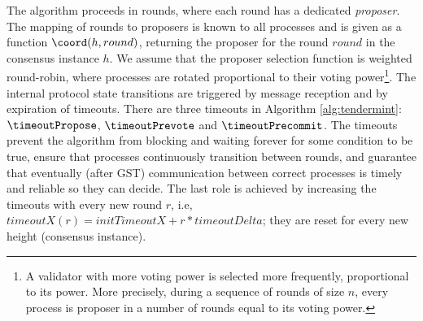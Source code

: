 The algorithm proceeds in rounds, where each round has a dedicated
\emph{proposer}. The mapping of rounds to proposers is known to all processes
and is given as a function $\coord(h, round)$, returning the proposer for
the round $round$ in the consensus instance $h$. We
assume that the proposer selection function is weighted round-robin, where
processes are rotated proportional to their voting power\footnote{A validator
with more voting power is selected more frequently, proportional to its power.
More precisely, during a sequence of rounds of size $n$, every process is
proposer in a number of rounds equal to its voting power.}. 
The internal protocol state transitions are triggered by message reception and 
by expiration of timeouts. There are three timeouts in Algorithm \ref{alg:tendermint}:
$\timeoutPropose$, $\timeoutPrevote$ and $\timeoutPrecommit$.
The timeouts prevent the algorithm from blocking and
waiting forever for some condition to be true, ensure that processes continuously 
transition between rounds, and guarantee that eventually (after GST) communication 
between correct processes is timely and reliable so they can decide. 
The last role is achieved by increasing the timeouts with every new round $r$, 
i.e, $timeoutX(r) = initTimeoutX + r*timeoutDelta$; 
they are reset for every new height (consensus
instance). 

